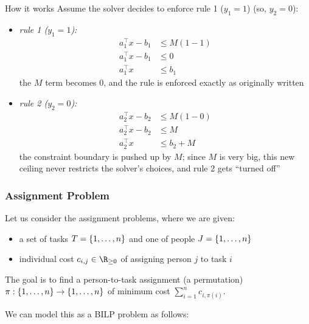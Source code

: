 \documentclass[a4paper, 11pt]{report}
\begin{document}
        \begin{gframe}{How it works}
            Assume the solver decides to enforce rule 1 ($y_1 = 1$) (so, $y_2 = 0$):

\begin{itemize}
    \item \textit{rule 1 ($y_1 = 1$):}
    \begin{align*}
        a_1^\top x - b_1 &\leq M(1 - 1) \\
        a_1^\top x - b_1 &\leq 0 \\
        a_1^\top x &\leq b_1
    \end{align*}
    the $M$ term becomes 0, and the rule is enforced exactly as originally written

    \item \textit{rule 2 ($y_2 = 0$):}
    \begin{align*}
        a_2^\top x - b_2 &\leq M(1 - 0) \\
        a_2^\top x - b_2 &\leq M \\
        a_2^\top x &\leq b_2 + M
    \end{align*}
    the constraint boundary is pushed up by $M$; since $M$ is very big, this new ceiling never restricts the solver's choices, and rule 2 gets ``turned off''
\end{itemize}
        \end{gframe}



\subsubsection{Assignment Problem}
Let us consider the assignment problems, where we are given:
\begin{itemize}
    \item a set of tasks $T = \set{1, \dots, n}$ and one of people $J = \set{1, \dots, n}$
    \item individual cost $c_{i,j} \in \R_{\geq 0}$ of assigning person $j$ to task $i$
\end{itemize}

The goal is to find a person-to-task assignment (a permutation) $\pi : \set{1, \dots, n} \to \set{1, \dots, n}$ of minimum cost $\sum_{i=1}^{n} c_{i, \pi(i)}$.

We can model this as a BILP problem as follows:
\end{document}
